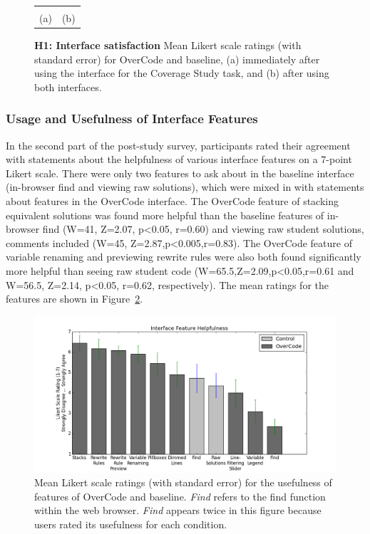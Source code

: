 \begin{figure}
\begin{tabular}{c c}
\begin{minipage}{.4\linewidth}
\end{minipage}
\\
(a) & (b)
\end{tabular}
\caption{{\bf H1: Interface satisfaction} Mean Likert scale ratings (with standard error) for  OverCode and baseline, (a) immediately after using the interface for the Coverage Study task, and (b) after using both interfaces.}
\label{studyLikert1_onPop2}
\end{figure}

\subsubsection{Usage and Usefulness of Interface Features}

In the second part of the post-study survey, participants rated their agreement with statements about the helpfulness of various interface features on a 7-point Likert scale. There were only two features to ask about in the baseline interface (in-browser find and viewing raw solutions), which were mixed in with statements about features in the OverCode interface. The OverCode feature of stacking equivalent solutions was found more helpful than the baseline features of in-browser find (W=41, Z=2.07, p<0.05, r=0.60) and viewing raw student solutions, comments included (W=45, Z=2.87,p<0.005,r=0.83). The OverCode feature of variable renaming and previewing rewrite rules were also both found significantly more helpful than seeing raw student code (W=65.5,Z=2.09,p<0.05,r=0.61 and W=56.5, Z=2.14, p<0.05, r=0.62, respectively). The mean ratings for the features are shown in Figure~\ref{featureHelpfulness}.

\begin{figure}
\centering
\includegraphics[scale=0.5]{Body/figures/overcode/featureHelpfulness.png}
\caption{Mean Likert scale ratings (with standard error) for the usefulness of features of OverCode and baseline.  {\it Find} refers to the find function within the web browser. {\it Find} appears twice in this figure because users rated its usefulness for each condition.}
\label{featureHelpfulness}
\end{figure}

